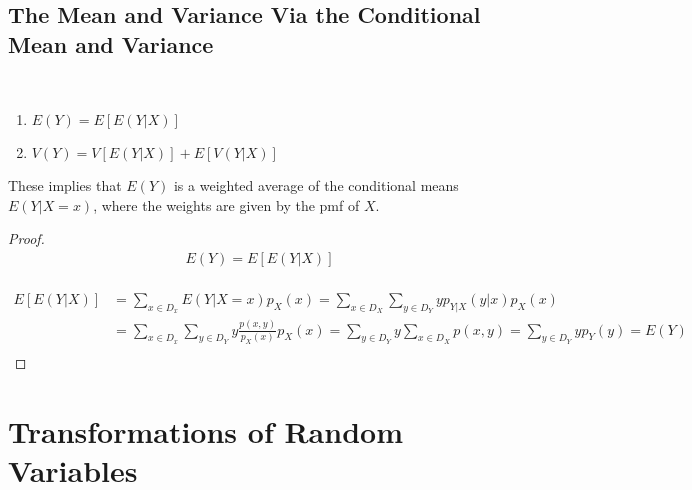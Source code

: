 \subsection{The Mean and Variance Via the Conditional Mean and Variance}

\begin{theorem}
    ~\\
    \begin{enumerate}[label=\textbf{\alph*.}]
        \item $E(Y) = E[E(Y|X)]$
        \item $V(Y) = V[E(Y|X)] + E[V(Y|X)]$
    \end{enumerate}

    These implies that $E(Y)$ is a weighted average of the conditional means $E(Y|X=x)$, where the weights are given by the pmf of $X$. 
\end{theorem}

\begin{proof}
    \begin{align*}
        E(Y) = E[E(Y|X)] \\
    \end{align*}

    \begin{align*}
        E[E(Y|X)] & = \sum_{x\in D_x} E(Y|X=x)p_X(x) = \sum_{x\in D_X}\sum_{y\in D_Y} y p_{Y|X}(y|x)p_X(x) \\
        & = \sum_{x\in D_x}\sum_{y\in D_Y} y \frac{p(x,y)}{p_X(x)} p_X(x) = \sum_{y\in D_Y} y \sum_{x\in D_X} p(x,y) = \sum_{y\in D_Y} yp_Y(y) = E(Y) \\
    \end{align*}
\end{proof}

\section{Transformations of Random Variables}

